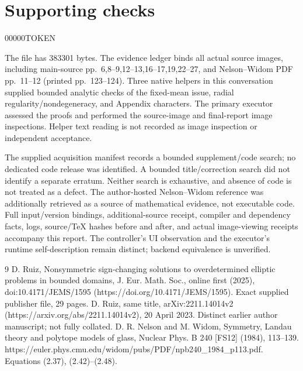 \documentclass[10pt]{article}
\begin{document}
\section*{Supporting checks}
00000TOKEN\par
The file has 383301 bytes. The evidence ledger binds all actual source images, including main-source pp. 6,8–9,12–13,16–17,19,22–27, and Nelson–Widom PDF pp. 11–12 (printed pp. 123–124). Three native helpers in this conversation supplied bounded analytic checks of the fixed-mean issue, radial regularity/nondegeneracy, and Appendix characters. The primary executor assessed the proofs and performed the source-image and final-report image inspections. Helper text reading is not recorded as image inspection or independent acceptance.\par
The supplied acquisition manifest records a bounded supplement/code search; no dedicated code release was identified. A bounded title/correction search did not identify a separate erratum. Neither search is exhaustive, and absence of code is not treated as a defect. The author-hosted Nelson–Widom reference was additionally retrieved as a source of mathematical evidence, not executable code. Full input/version bindings, additional-source receipt, compiler and dependency facts, logs, source/TeX hashes before and after, and actual image-viewing receipts accompany this report. The controller’s UI observation and the executor’s runtime self-description remain distinct; backend equivalence is unverified.\par
9 D. Ruiz, Nonsymmetric sign-changing solutions to overdetermined elliptic problems in bounded domains, J. Eur. Math. Soc., online first (2025), doi:10.4171/JEMS/1595 (https://doi.org/10.4171/JEMS/1595). Exact supplied publisher file, 29 pages. D. Ruiz, same title, arXiv:2211.14014v2 (https://arxiv.org/abs/2211.14014v2), 20 April 2023. Distinct earlier author manuscript; not fully collated. D. R. Nelson and M. Widom, Symmetry, Landau theory and polytope models of glass, Nuclear Phys. B 240 [FS12] (1984), 113–139. https://euler.phys.cmu.edu/widom/pubs/PDF/npb240\_1984\_p113.pdf. Equations (2.37), (2.42)–(2.48).\par
\end{document}
